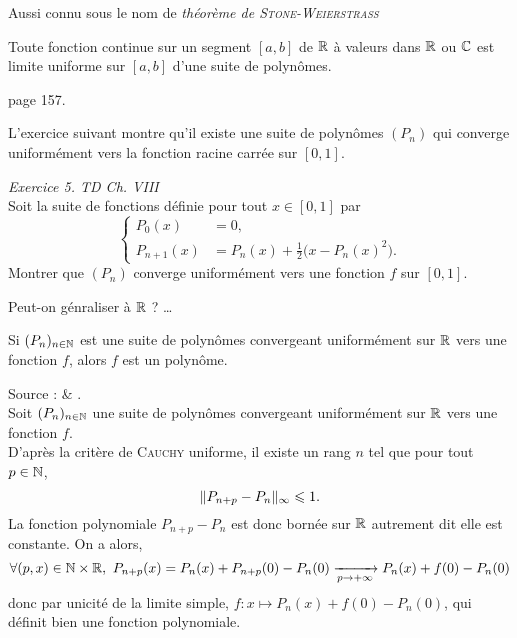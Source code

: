 Aussi connu sous le nom  de \emph{théorème de \textsc{Stone-Weierstrass}}

\begin{theo}
    Toute fonction continue sur un segment $[a, b]$ de $\mathbb{R}$ à valeurs dans $\mathbb{R}$ ou $\mathbb{C}$ est limite uniforme sur $[a, b]$ d'une suite de polynômes.
\end{theo}

\begin{preuve}
    \cite{calcul_infinitesimal} page 157.
\end{preuve} 

L'exercice suivant montre qu'il existe une suite de polynômes $(P_n)$ qui converge uniformément vers la fonction racine carrée sur $[0, 1]$.

\begin{exercice}
    \emph{Exercice 5. TD Ch. VIII}\\
    Soit la suite de fonctions définie pour tout $x \in [0, 1]$ par
    $$
    \begin{cases}
        P_0(x) &= 0,\\
        P_{n+1}(x) &= P_n (x) + \frac{1}{2} \big( x-P_n (x)^2 \big).
    \end{cases}
    $$
    Montrer que $(P_n)$ converge uniformément vers une fonction $f$ sur $[0, 1]$.
\end{exercice}

\begin{marginfigure}[-5cm]
	
\end{marginfigure}

Peut-on génraliser à $\mathbb{R}$ ? \dots

\begin{prop}
    Si $(P_n)_{n \in \mathbb{N}}$ est une suite de polynômes convergeant uniformément sur $\mathbb{R}$ vers une fonction $f$, alors $f$ est un polynôme.
\end{prop}

\begin{preuve}
    Source : \cite{exos_oraux} \& \cite{maths-france}. \\
    Soit $(P_n)_{n \in \mathbb{N}}$ une suite de polynômes convergeant uniformément sur $\mathbb{R}$ vers une fonction $f$. \\
    D'après la critère de \textsc{Cauchy} uniforme, il existe un rang $n$ tel que pour tout $p \in \mathbb{N}$, 
    $$\Vert P_{n+p} - P_n \Vert_\infty \leqslant 1.$$
    La fonction polynomiale $P_{n+p} - P_n$ est donc bornée sur $\mathbb{R}$ autrement dit elle est constante. On a alors,
    $$\forall (p, x) \in \mathbb{N} \times \mathbb{R},\ P_{n+p}(x) = P_n(x) + P_{n+p}(0) - P_n(0) \xrightarrow[p \to + \infty]{} P_n(x) + f(0) - P_n(0)$$
    donc par unicité de la limite simple, $f : x \mapsto P_n(x) + f(0) - P_n(0)$, qui définit bien une fonction polynomiale. 
\end{preuve}